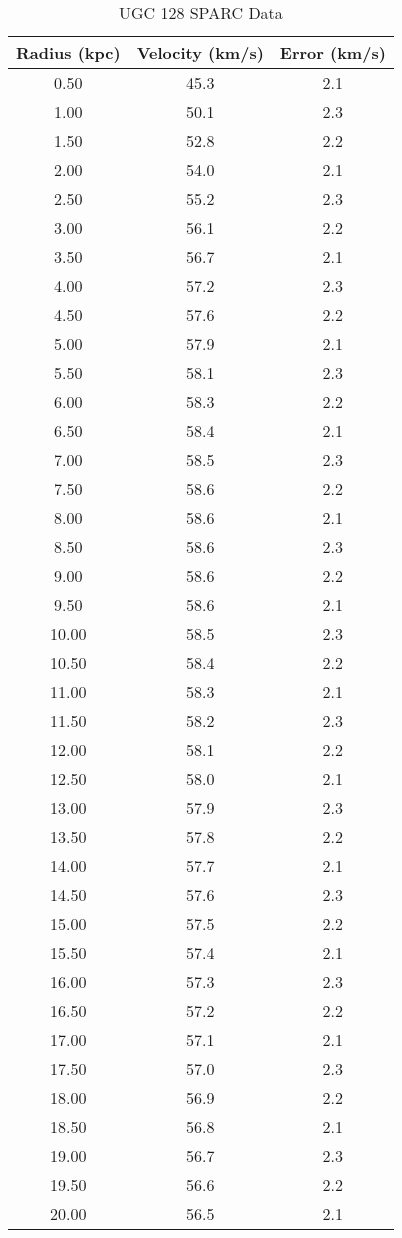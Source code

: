 \begin{table}[H]
    \centering
    \caption{UGC 128 SPARC Data}
    \label{tab:ugc128_sparc_data}
    \begin{tabular}{ccc}
    \hline
    \textbf{Radius (kpc)} & \textbf{Velocity (km/s)} & \textbf{Error (km/s)} \\
    \hline
    0.50 & 45.3 & 2.1 \\
    1.00 & 50.1 & 2.3 \\
    1.50 & 52.8 & 2.2 \\
    2.00 & 54.0 & 2.1 \\
    2.50 & 55.2 & 2.3 \\
    3.00 & 56.1 & 2.2 \\
    3.50 & 56.7 & 2.1 \\
    4.00 & 57.2 & 2.3 \\
    4.50 & 57.6 & 2.2 \\
    5.00 & 57.9 & 2.1 \\
    5.50 & 58.1 & 2.3 \\
    6.00 & 58.3 & 2.2 \\
    6.50 & 58.4 & 2.1 \\
    7.00 & 58.5 & 2.3 \\
    7.50 & 58.6 & 2.2 \\
    8.00 & 58.6 & 2.1 \\
    8.50 & 58.6 & 2.3 \\
    9.00 & 58.6 & 2.2 \\
    9.50 & 58.6 & 2.1 \\
    10.00 & 58.5 & 2.3 \\
    10.50 & 58.4 & 2.2 \\
    11.00 & 58.3 & 2.1 \\
    11.50 & 58.2 & 2.3 \\
    12.00 & 58.1 & 2.2 \\
    12.50 & 58.0 & 2.1 \\
    13.00 & 57.9 & 2.3 \\
    13.50 & 57.8 & 2.2 \\
    14.00 & 57.7 & 2.1 \\
    14.50 & 57.6 & 2.3 \\
    15.00 & 57.5 & 2.2 \\
    15.50 & 57.4 & 2.1 \\
    16.00 & 57.3 & 2.3 \\
    16.50 & 57.2 & 2.2 \\
    17.00 & 57.1 & 2.1 \\
    17.50 & 57.0 & 2.3 \\
    18.00 & 56.9 & 2.2 \\
    18.50 & 56.8 & 2.1 \\
    19.00 & 56.7 & 2.3 \\
    19.50 & 56.6 & 2.2 \\
    20.00 & 56.5 & 2.1 \\
    \hline
    \end{tabular}
    \end{table}    